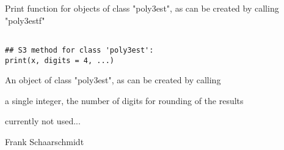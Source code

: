 \begin{Description}\relax
Print function for objects of class "poly3est", as can be created by calling "poly3estf"
\end{Description}
\begin{Usage}
\begin{verbatim}

## S3 method for class 'poly3est':
print(x, digits = 4, ...)
\end{verbatim}
\end{Usage}
\begin{Arguments}
\begin{ldescription}
\item[\code{x}] An object of class "poly3est", as can be created by calling  
\item[\code{digits}] a single integer, the number of digits for rounding of the results 
\item[\code{...}] currently not used... 
\end{ldescription}
\end{Arguments}
\begin{Author}\relax
Frank Schaarschmidt
\end{Author}

